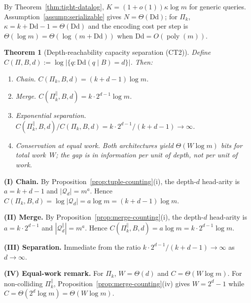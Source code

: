 \documentclass[journal]{IEEEtran}
\makeatletter
\newcommand{\Dd}{\text{Dd}}
\newcommand{\poly}{\operatorname{poly}}
\newtheorem{theorem}{Theorem}[section]
\numberwithin{equation}{section}
\renewenvironment{proof}[1][\proofname]{\par
  \pushQED{\qed}%
  \normalfont \topsep6\p@\@plus6\p@\relax
  \trivlist
  \item[\hskip\labelsep
        \itshape
    #1\@addpunct{.}]\ignorespaces
}{%
  \popQED\endtrivlist\@endpefalse
}
\makeatother
\begin{document}
\begin{proof}
By Theorem~\ref{thm:tight-datalog},
$K=(1{+}o(1))\kappa\log m$ for generic queries.
Assumption~\ref{assump:serializable} gives
$N=\Theta(\Dd)$; for $\Pi_k$,
$\kappa=k{+}\Dd{-}1=\Theta(\Dd)$
and the encoding cost per step is
$\Theta(\log m)=\Theta(\log(m{+}\Dd))$ when
$\Dd=O(\poly(m))$.
\end{proof}

\begin{theorem}[Depth-reachability capacity separation
  \textup{(CT2)}]
\label{thm:exponential-capacity}
Define
$C(\Pi,B,d):=\log|\{q:\Dd(q\mid B)=d\}|$.
Then:
\begin{enumerate}[label=\textup{(\Roman*)}]
\item \emph{Chain.}\;
$C(\Pi_k,B,d)=(k{+}d{-}1)\log m$.

\item \emph{Merge.}\;
$C(\Pi_k^{\parallel},B,d)=k\cdot 2^{d-1}\log m$.

\item \emph{Exponential separation.}\;
$C(\Pi_k^{\parallel},B,d)/C(\Pi_k,B,d)
=k\cdot 2^{d-1}/(k{+}d{-}1)\to\infty$.

\item \emph{Conservation at equal work.}\;
Both architectures yield $\Theta(W\log m)$ bits for
total work~$W$; the gap is in information per unit of
\emph{depth}, not per unit of work.
\end{enumerate}
\end{theorem}

\begin{proof}
\textbf{(I) Chain.}
By Proposition~\ref{prop:tuple-counting}(i), the depth-\(d\) head-arity is
\(a=k+d-1\) and \(|\mathcal Q_d|=m^{a}\). Hence
\(C(\Pi_k,B,d)=\log|\mathcal Q_d|=a\log m=(k+d-1)\log m\).

\textbf{(II) Merge.}
By Proposition~\ref{prop:merge-counting}(i), the depth-\(d\) head-arity is
\(a=k\cdot 2^{d-1}\) and \(|\mathcal Q_d^{\parallel}|=m^{a}\). Hence
\(C(\Pi_k^{\parallel},B,d)=a\log m=k\cdot 2^{d-1}\log m\).

\textbf{(III) Separation.}
Immediate from the ratio \(k\cdot 2^{d-1}/(k+d-1)\to\infty\) as \(d\to\infty\).

\textbf{(IV) Equal-work remark.}
For \(\Pi_k\), \(W=\Theta(d)\) and \(C=\Theta(W\log m)\).
For non-colliding \(\Pi_k^{\parallel}\), Proposition~\ref{prop:merge-counting}(iv)
gives \(W=2^d-1\) while \(C=\Theta(2^d\log m)=\Theta(W\log m)\).
\end{proof}
\end{document}
